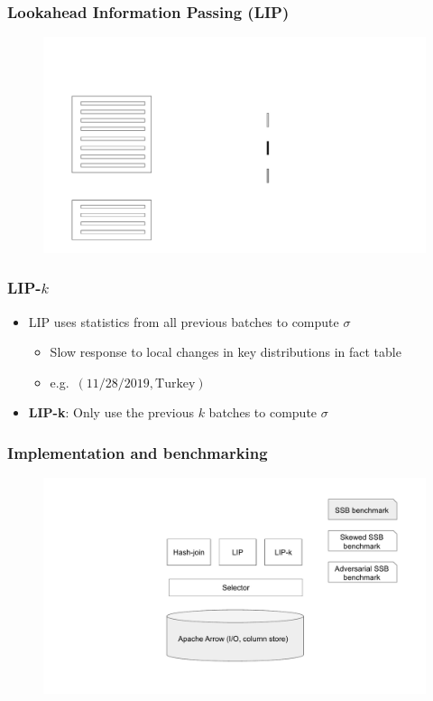\documentclass{beamer}
\begin{document}
\begin{frame}[noframenumbering]
  \frametitle{Lookahead Information Passing (LIP)}
  \begin{figure}
    \centering
    \includegraphics[page={26},height=0.7\textheight,keepaspectratio]{lip-animation}
  \end{figure}
  
\end{frame}

\begin{frame}
  \frametitle{LIP-$k$}

  \begin{itemize}
    \item LIP uses statistics from all previous batches to compute $\sigma$
    \begin{itemize}
        \item Slow response to local changes in key distributions in fact table
        \item e.g.\ $(11/28/2019, \text{Turkey})$
    \end{itemize}
    \item \textbf{LIP-k}: Only use the previous $k$ batches to compute $\sigma$
  \end{itemize}

\end{frame}


\begin{frame}
  \frametitle{Implementation and benchmarking}
  \begin{figure}
    \centering
    \includegraphics[height=0.7\textheight,keepaspectratio]{implementation}
  \end{figure}
\end{frame}
\end{document}
